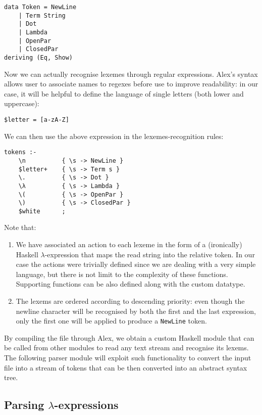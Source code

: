 \documentclass{article}
\begin{document}
\begin{lstlisting}
data Token = NewLine
    | Term String
    | Dot
    | Lambda
    | OpenPar
    | ClosedPar
deriving (Eq, Show)
\end{lstlisting}

Now we can actually recognise lexemes through regular expressions. Alex's syntax allows user to associate names to regexes before use to improve readability: in our case, it will be helpful to define the language of single letters (both lower and uppercase):

\begin{lstlisting}
$letter = [a-zA-Z]
\end{lstlisting}

We can then use the above expression in the lexemes-recognition rules:

\begin{lstlisting}
tokens :-
    \n          { \s -> NewLine }
    $letter+    { \s -> Term s }
    \.          { \s -> Dot }
    \λ          { \s -> Lambda }
    \(          { \s -> OpenPar }
    \)          { \s -> ClosedPar }
    $white      ;
\end{lstlisting}

Note that:

\begin{enumerate}
    \item We have associated an action to each lexeme in the form of a (ironically) Haskell $\lambda$-expression that maps the read string into the relative token. In our case the actions were trivially defined since we are dealing with a very simple language, but there is not limit to the complexity of these functions. Supporting functions can be also defined along with the custom datatype.
    \item The lexems are ordered according to descending priority: even though the newline character will be recognised by both the first and the last expression, only the first one will be applied to produce a \lstinline|NewLine| token.
\end{enumerate}

By compiling the file through Alex, we obtain a custom Haskell module that can be called from other modules to read any text stream and recognise its lexems. The following parser module will exploit such functionality to convert the input file into a stream of tokens that can be then converted into an abstract syntax tree.

\subsection{Parsing $\lambda$-expressions}
\end{document}
